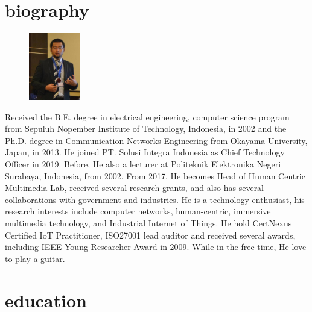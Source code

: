 \documentclass[style=verbose,maxnames=99,sorting=ydnt,style=verbose,maxnames=99,sorting=ydnt,backend=biber]{friggeri-cv} %
\begin{document}
\section{biography}

\begin{figure}
	\vspace{-10pt}
	\begin{center}
    \includegraphics[width=0.2\textwidth]{dhoto-jas.jpg}
    \end{center}
    
\end{figure}
Received the B.E. degree in electrical engineering, computer science program from Sepuluh Nopember Institute of Technology, Indonesia, in 2002 and the Ph.D. degree in Communication Networks Engineering from Okayama University, Japan, in 2013. He joined PT. Solusi Integra Indonesia as Chief Technology Officer in 2019. Before, He also a lecturer at Politeknik Elektronika Negeri Surabaya, Indonesia, from 2002. From 2017, He becomes Head of Human Centric Multimedia Lab, received several research grants, and also has several collaborations with government and industries. He is a technology enthusiast, his research interests include computer networks, human-centric, immersive multimedia technology, and Industrial Internet of Things. He hold CertNexus Certified IoT Practitioner, ISO27001 lead auditor and received several awards, including IEEE Young Researcher Award in 2009. While in the free time, He love to play a guitar.



\section{education}
\end{document}
